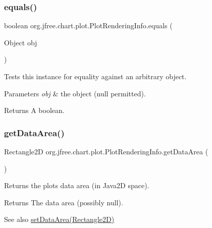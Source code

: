 \subsubsection{\texorpdfstring{equals()}{equals()}}
{\footnotesize\ttfamily boolean org.\+jfree.\+chart.\+plot.\+Plot\+Rendering\+Info.\+equals (\begin{DoxyParamCaption}\item[{Object}]{obj }\end{DoxyParamCaption})}

Tests this instance for equality against an arbitrary object.


\begin{DoxyParams}{Parameters}
{\em obj} & the object ({\ttfamily null} permitted).\\
\hline
\end{DoxyParams}
\begin{DoxyReturn}{Returns}
A boolean. 
\end{DoxyReturn}
\mbox{\label{classorg_1_1jfree_1_1chart_1_1plot_1_1_plot_rendering_info_a1dc9b2a8f70081daab3309ff46747dfd}} 
\subsubsection{\texorpdfstring{get\+Data\+Area()}{getDataArea()}}
{\footnotesize\ttfamily Rectangle2D org.\+jfree.\+chart.\+plot.\+Plot\+Rendering\+Info.\+get\+Data\+Area (\begin{DoxyParamCaption}{ }\end{DoxyParamCaption})}

Returns the plot\textquotesingle{}s data area (in Java2D space).

\begin{DoxyReturn}{Returns}
The data area (possibly {\ttfamily null}).
\end{DoxyReturn}
\begin{DoxySeeAlso}{See also}
\mbox{\hyperlink{classorg_1_1jfree_1_1chart_1_1plot_1_1_plot_rendering_info_a0b5df4dec91b5707b3571df045d6aee9}{set\+Data\+Area(\+Rectangle2\+D)}} 
\end{DoxySeeAlso}
\mbox{\label{classorg_1_1jfree_1_1chart_1_1plot_1_1_plot_rendering_info_a9410ad200dac0113cf8ab35365227541}} 
